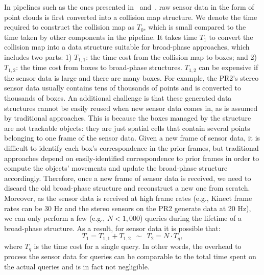 In pipelines such as the ones presented in~\cite{Rusu:RPG:2009}
and~\cite{Ioan:2010}, raw sensor data in the form of point
clouds is first converted into a collision map structure.
We denote the time required to construct the collision map as $T_0$,
which is small compared to the time taken by other components in the
pipeline. It takes time $T_1$ to convert the collision map into a data
structure suitable for broad-phase approaches, which includes two
parts: 1) $T_{1,1}$: the time cost from the collision map to boxes; and 2)
$T_{1,2}$: the time cost from boxes to broad-phase
structures. $T_{1,2}$ can be expensive if the sensor data is large and
there are many boxes. For example, the PR2's stereo sensor data usually
contains tens of thousands of points and is converted to thousands of
boxes. An additional challenge is that these generated data structures
cannot be easily reused when new sensor data comes in, as is
assumed by traditional approaches.
This is because the boxes
managed by the structure are not trackable objects: they are just
spatial cells that contain several points belonging to one frame of
the sensor data. Given a new frame of sensor data, it is difficult to
identify each box's correspondence in the prior frames, but traditional approaches depend on easily-identified correspondence to prior frames in order to compute the objects' movements and update the broad-phase structure accordingly. Therefore, once a
new frame of sensor data is received, we need to discard the old broad-phase structure and reconstruct a new one from scratch. Moreover, as
the sensor data is received at high frame rates (e.g., Kinect frame
rates can be 30 Hz and the stereo sensors on the PR2 generate data at 20
Hz), we can only perform a few
(e.g., $N < 1,000$) queries during the lifetime of a broad-phase
structure. As a result, for sensor data it is possible that:
\begin{equation}
T_1 = T_{1,1} + T_{1,2} \ \ \sim \ \ T_2 = N \cdot T_q,
\end{equation}
where $T_q$ is the time cost for a single query. In other words, the overhead to process the sensor data for queries can be comparable to the total time spent on the actual queries and is in fact not negligible.

